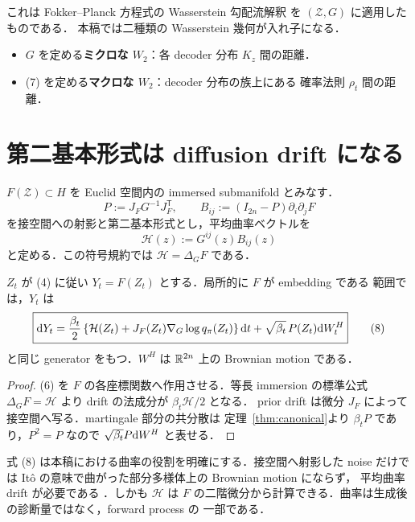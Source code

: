 \documentclass[uplatex,dvipdfmx,11pt,a4paper]{jsarticle}
\begin{document}
これは Fokker--Planck 方程式の Wasserstein 勾配流解釈
\cite{jordan1998} を $(\mathcal{Z},G)$ に適用したものである．
本稿では二種類の Wasserstein 幾何が入れ子になる．

\begin{itemize}
  \item $G$ を定める\textbf{ミクロな $W_2$}：各 decoder 分布 $K_z$ 間の距離．
  \item (7) を定める\textbf{マクロな $W_2$}：decoder 分布の族上にある
    確率法則 $\rho_t$ 間の距離．
\end{itemize}

\section{第二基本形式は diffusion drift になる}
\label{sec:curvature-drift}

$F(\mathcal{Z})\subset H$ を Euclid 空間内の immersed submanifold とみなす．
\[
  P:=J_FG^{-1}J_F^{\mathsf T},
  \qquad
  B_{ij}:=(I_{2n}-P)\partial_i\partial_jF
\]
を接空間への射影と第二基本形式とし，平均曲率ベクトルを
\[
  \mathcal{H}(z):=G^{ij}(z)B_{ij}(z)
\]
と定める．この符号規約では $\mathcal{H}=\Delta_GF$ である．

\begin{theorem}
\label{thm:extrinsic}
  $Z_t$ が (4) に従い $Y_t=F(Z_t)$ とする．局所的に $F$ が embedding である
  範囲では，$Y_t$ は
  \[
    \boxed{
    \mathrm{d} Y_t
    =\frac{\beta_t}{2}
       \left\{\mathcal{H}(Z_t)
       +J_F(Z_t)\nabla_G\log q_\pi(Z_t)\right\}\mathrm{d} t
     +\sqrt{\beta_t}\,P(Z_t)\mathrm{d} W_t^{H}
    }
    \tag{8}
  \]
  と同じ generator をもつ．$W^H$ は $\mathbb{R}^{2n}$ 上の Brownian motion である．
\end{theorem}

\begin{proof}
  (6) を $F$ の各座標関数へ作用させる．等長 immersion の標準公式
  $\Delta_GF=\mathcal{H}$ より drift の法成分が $\beta_t\mathcal{H}/2$ となる．
  prior drift は微分 $J_F$ によって接空間へ写る．martingale 部分の共分散は
  定理~\ref{thm:canonical}より $\beta_tP$ であり，$P^2=P$ なので
  $\sqrt{\beta_t}P\mathrm{d} W^H$ と表せる．
\end{proof}

式 (8) は本稿における曲率の役割を明確にする．接空間へ射影した noise だけでは
It\^o の意味で曲がった部分多様体上の Brownian motion にならず，
平均曲率 drift が必要である \cite{hsu2002}．しかも $\mathcal{H}$ は
$F$ の二階微分から計算できる．曲率は生成後の診断量ではなく，forward process の
一部である．
\end{document}
